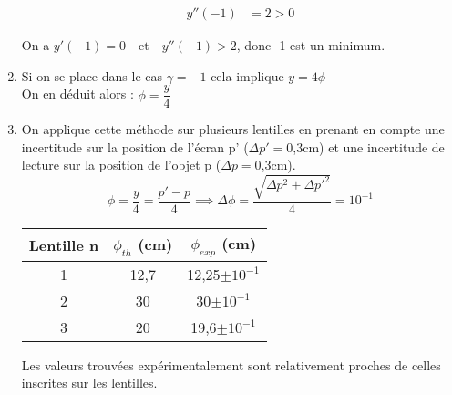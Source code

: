 \documentclass[12pt,a4paper]{article}
\begin{document}
\begin{enumerate}
\begin{multicols}{2}
\begin{align*}
			y''(-1)&=2>0
			\end{align*}
		\end{multicols}
		\vspace*{+1em}
		On a $y'(-1)=0 \quad \text{et} \quad y''(-1)>2$, donc -1 est un minimum.\\
		\item Si on se place dans le cas $\gamma=-1$ cela implique $y=4\phi$\\[2pt]
		On en déduit alors : $\phi=\dfrac{y}{4}$
		\item 
		On applique cette méthode sur plusieurs lentilles en prenant en compte une incertitude sur la position de l'écran p' ($\Delta p'=$0,3cm) et une incertitude de lecture sur la position de l'objet p ($\Delta p=$0,3cm).
		$$\phi=\dfrac{y}{4}=\dfrac{p'-p}{4}\implies \Delta \phi = \dfrac{\sqrt{\Delta p^2+\Delta p'^2}}{4}=10^{-1}$$
		\begin{center}
			
			\begin{tabular}{|c|c|c|}
				\hline 
				Lentille n & $\phi_{th}$ (cm) & $\phi_{exp}$ (cm) \\ 
				\hline 
				1 & 12,7 & 12,25$\pm10^{-1}$ \\ 
				\hline 
				2 & 30 & 30$\pm10^{-1}$ \\ 
				\hline 
				3 & 20 & 19,6$\pm10^{-1}$ \\ 
				\hline 
			\end{tabular} 
		\end{center}
		Les valeurs trouvées expérimentalement sont relativement proches de celles inscrites sur les lentilles.
	\end{enumerate}
\end{document}
